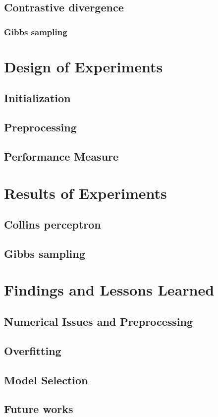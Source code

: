 \documentclass[twoside,12pt]{article}
\begin{document}
\subsection{Contrastive divergence}
\subsubsection{Gibbs sampling}
\section{Design of Experiments}
\subsection{Initialization}
\subsection{Preprocessing}
\subsection{Performance Measure}
\section{Results of Experiments}
\subsection{Collins perceptron}
\subsection{Gibbs sampling}

\section{Findings and Lessons Learned}
\subsection{Numerical Issues and Preprocessing}
\subsection{Overfitting}
\subsection{Model Selection}
\subsection{Future works}
\end{document}
